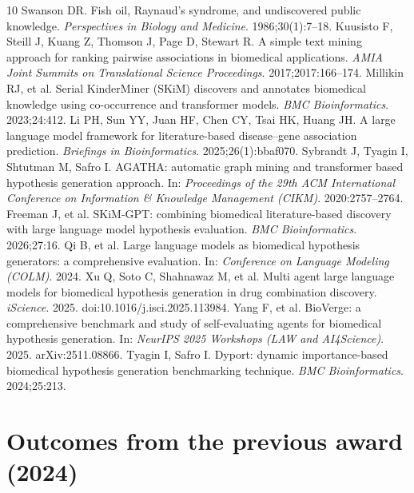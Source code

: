 \documentclass[11pt]{article}
\begin{document}
\begin{thebibliography}{10}\small
\setlength{\itemsep}{0pt}
 Swanson DR. Fish oil, Raynaud's syndrome, and undiscovered public knowledge. \emph{Perspectives in Biology and Medicine}. 1986;30(1):7--18.
 Kuusisto F, Steill J, Kuang Z, Thomson J, Page D, Stewart R. A simple text mining approach for ranking pairwise associations in biomedical applications. \emph{AMIA Joint Summits on Translational Science Proceedings}. 2017;2017:166--174.
 Millikin RJ, et al. Serial KinderMiner (SKiM) discovers and annotates biomedical knowledge using co-occurrence and transformer models. \emph{BMC Bioinformatics}. 2023;24:412.
 Li PH, Sun YY, Juan HF, Chen CY, Tsai HK, Huang JH. A large language model framework for literature-based disease--gene association prediction. \emph{Briefings in Bioinformatics}. 2025;26(1):bbaf070.
 Sybrandt J, Tyagin I, Shtutman M, Safro I. AGATHA: automatic graph mining and transformer based hypothesis generation approach. In: \emph{Proceedings of the 29th ACM International Conference on Information \& Knowledge Management (CIKM)}. 2020:2757--2764.
 Freeman J, et al. SKiM-GPT: combining biomedical literature-based discovery with large language model hypothesis evaluation. \emph{BMC Bioinformatics}. 2026;27:16.
 Qi B, et al. Large language models as biomedical hypothesis generators: a comprehensive evaluation. In: \emph{Conference on Language Modeling (COLM)}. 2024.
 Xu Q, Soto C, Shahnawaz M, et al. Multi agent large language models for biomedical hypothesis generation in drug combination discovery. \emph{iScience}. 2025. doi:10.1016/j.isci.2025.113984.
 Yang F, et al. BioVerge: a comprehensive benchmark and study of self-evaluating agents for biomedical hypothesis generation. In: \emph{NeurIPS 2025 Workshops (LAW and AI4Science)}. 2025. arXiv:2511.08866.
 Tyagin I, Safro I. Dyport: dynamic importance-based biomedical hypothesis generation benchmarking technique. \emph{BMC Bioinformatics}. 2024;25:213.
\end{thebibliography}

\clearpage
\section*{Outcomes from the previous award (2024)}
\end{document}
